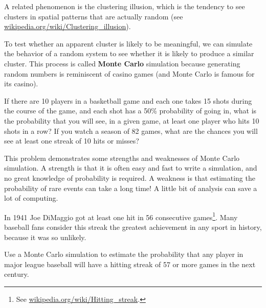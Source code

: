 \documentclass[12pt]{book}
\begin{document}

A related phenomenon is the clustering illusion, which is the
tendency to see clusters in spatial patterns that are actually
random (see \url{wikipedia.org/wiki/Clustering_illusion}).


To test whether an apparent
cluster is likely to be meaningful, we can simulate the behavior
of a random system to see whether it is likely to produce a similar
cluster.  This process is called {\bf Monte Carlo} simulation because
generating random numbers is reminiscent of casino games (and Monte
Carlo is famous for its casino).

\begin{exercise}
If there are 10 players in a basketball game and each one takes
15 shots during the course of the game, and each shot has a
50\% probability of going in, what is the probability that 
you will see, in a given game, at least one player who
hits 10 shots in a row?  If you watch a season of 82 games,
what are the chances you will see at least one streak of
10 hits or misses?


This problem demonstrates some strengths and weaknesses of Monte
Carlo simulation.  A strength is that it is often easy and fast
to write a simulation, and no great knowledge of probability is
required.  A weakness is that estimating the probability of
rare events can take a long time!  A little bit of analysis can
save a lot of computing.

\end{exercise}


\begin{exercise}
In 1941 Joe DiMaggio got at least one hit
in 56 consecutive games\footnote{See
  \url{wikipedia.org/wiki/Hitting_streak}.}.  Many baseball fans
consider this streak the greatest achievement in any sport in history,
because it was so unlikely.



Use a Monte Carlo simulation to estimate the probability that
any player in major league baseball will have a hitting streak
of 57 or more games in the next century.

\end{exercise}
\end{document}
